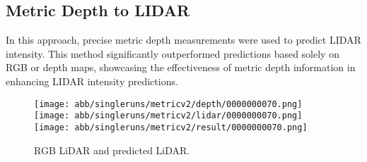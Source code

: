\subsection{Metric Depth to LIDAR}

In this approach, precise metric depth measurements were used to predict LIDAR intensity. This method significantly outperformed predictions based solely on RGB or depth maps, showcasing the effectiveness of metric depth information in enhancing LIDAR intensity predictions.
\begin{figure}[!ht]
	\centering
	\texttt{[image: abb/singleruns/metricv2/depth/0000000070.png]}
	\texttt{[image: abb/singleruns/metricv2/lidar/0000000070.png]}
	\texttt{[image: abb/singleruns/metricv2/result/0000000070.png]}
	\caption{RGB LiDAR and predicted LiDAR.}
	\label{depth}
\end{figure}


